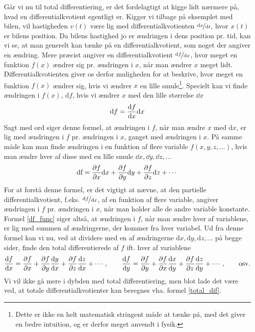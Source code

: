 \noindent
Går vi nu til total differentiering, er det fordelagtigt at kigge lidt nærmere på, hvad en differentialkvotient egentligt er. Kigger vi tilbage på eksemplet med bilen, vil hastigheden $v(t)$ være lig med differentialkvotienten $\nicefrac{\dd x}{\dd t}$, hvor $x(t)$ er bilens position. Da bilens hastighed jo er ændringen i dens position pr. tid, kan vi se, at man generelt kan tænke på en differentialkvotient, som noget der angiver en ændring. Mere præcist angiver en differentialkvotient $\nicefrac{\dd f}{\dd x}$, hvor meget en funktion $f(x)$ ændrer sig pr. ændringen i $x$, når man ændrer $x$ meget lidt. Differentialkvotienten giver os derfor muligheden for at beskrive, hvor meget en funktion $f(x)$ ændrer sig, hvis vi ændrer $x$ en lille smule\footnote{Dette er ikke en helt matematisk stringent måde at tænke på, med det giver en bedre intuition, og er derfor meget anvendt i fysik.}. Specielt kan vi finde ændringen i $f(x)$, $\text{d}f$, hvis vi ændrer $x$ med den lille størrelse $\dd{x}$
\begin{equation*}
\text{d}f = \dv{f}{x} \text{d}x
\end{equation*}
Sagt med ord siger denne formel, at ændringen i $f$, når man ændre $x$ med $\text{d}x$, er lig med ændringen i $f$ pr. ændringen i $x$, ganget med ændringen i $x$. På samme måde kan man finde ændringen i en funktion af flere variable $f(x,y,z,\ldots)$, hvis man ændre hver af disse med en lille smule $\dd{x},\dd{y},\dd{z},...$
\begin{equation}
\label{df_func}
\text{df} = \pdv{f}{x} \text{d}x + \pdv{f}{y} \text{d}y + \pdv{f}{z} \text{d}z + \cdots
\end{equation}
For at forstå denne formel, er det vigtigt at nævne, at den partielle differentialkvotient, f.eks. $\nicefrac{\dd f}{\dd x}$, af en funktion af flere variable, angiver ændringen i $f$ pr. ændringen i $x$, når man holder alle de andre variable konstante. Formel \eqref{df_func} siger altså, at ændringen i $f$, når man ændre hver af variablene, er lig med summen af ændringerne, der kommer fra hver variabel. Ud fra denne formel kan vi nu, ved at dividere med en af ændringerne $\text{d}x,\text{d}y,\text{d}z,\ldots$ på begge sider, finde den total differentierede af $f$ ift. hver af variablene
\begin{align}
\label{total_dif}
\dv{f}{x} = \pdv{f}{x} + \pdv{f}{y} \dv{y}{x} + \pdv{f}{z} \dv{z}{x} + \cdots \, , \qquad \dv{f}{y} = \pdv{f}{y} + \pdv{f}{x} \dv{x}{y} + \pdv{f}{z} \dv{z}{y} + \cdots \, , \qquad \text{osv.}
\end{align}
Vi vil ikke gå mere i dybden med total differentiering, men blot lade det være ved, at totale differentialkvotienter kan beregnes vha. formel \eqref{total_dif}. 


